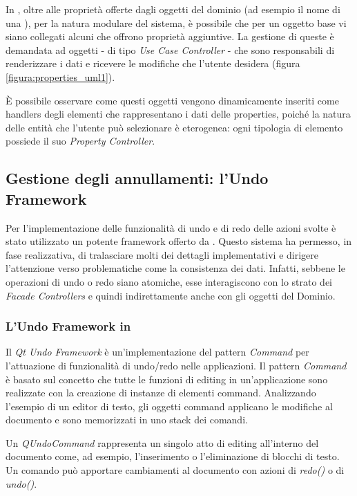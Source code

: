 In \visualnetkit{}, oltre alle proprietà offerte dagli oggetti del dominio (ad esempio il nome di una \virtualmachine{}), per la natura modulare del sistema, è possibile che per un oggetto base vi siano collegati alcuni \plugin{} che offrono proprietà aggiuntive.
La gestione di queste è demandata ad oggetti - di tipo \emph{Use Case Controller} - che sono responsabili di renderizzare i dati e ricevere le modifiche che l'utente desidera (figura \ref{figura:properties_uml1}).

È possibile osservare come questi oggetti vengono dinamicamente inseriti come handlers degli elementi che rappresentano i dati delle properties, poiché la natura delle entità che l'utente può selezionare è eterogenea: ogni tipologia di elemento possiede il suo \emph{Property Controller}.

\subsection{Gestione degli annullamenti: l'Undo Framework}
Per l'implementazione delle funzionalità di undo e di redo delle azioni svolte è stato utilizzato un potente framework offerto da \qt{}. Questo sistema ha permesso, in fase realizzativa, di tralasciare molti dei dettagli implementativi e dirigere l'attenzione verso problematiche come la consistenza dei dati. Infatti, sebbene le operazioni di undo o redo siano atomiche, esse interagiscono con lo strato dei \emph{Facade Controllers} e quindi indirettamente anche con gli oggetti del Dominio.

\subsubsection*{L'Undo Framework in \qt{}}
Il \emph{Qt Undo Framework} è un'implementazione del pattern \emph{Command}\cite{AUPL04} per l'attuazione di funzionalità di undo/redo nelle applicazioni.
Il pattern \emph{Command} è basato sul concetto che tutte le funzioni di editing in un'applicazione sono realizzate con la creazione di instanze di elementi command. Analizzando l'esempio di un editor di testo, gli oggetti command applicano le modifiche al documento e sono memorizzati in uno stack dei comandi.

Un \emph{QUndoCommand} rappresenta un singolo atto di editing all'interno del documento come, ad esempio, l'inserimento o l'eliminazione di blocchi di testo. Un comando può apportare cambiamenti al documento con azioni di \emph{redo()} o di \emph{undo()}.

